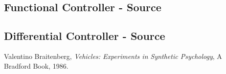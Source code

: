 \documentclass[paper=a4, fontsize=12pt]{scrartcl}	%
\numberwithin{equation}{section}		%
\numberwithin{figure}{section}			%
\numberwithin{table}{section}				%
\begin{document}
\subsection{Functional Controller - Source}

\subsection{Differential Controller - Source}

\begin{thebibliography}{9}
  Valentino Braitenberg,
  \emph{Vehicles: Experiments in Synthetic Psychology},
  A Bradford Book,
  1986.
\end{thebibliography}

\end{document}
